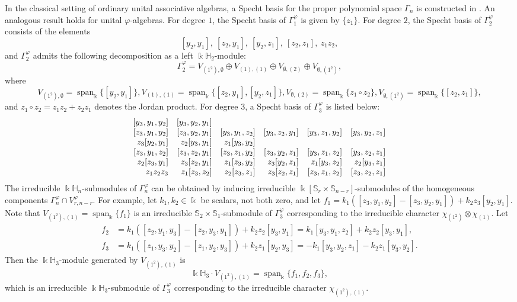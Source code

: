 \documentclass{amsart}
\theoremstyle{definition}
\theoremstyle{remark}
\numberwithin{equation}{section}
\def \Ga{\Gamma}
\def \vp{\varphi}
\def \k{\Bbbk}
\def \H{\mathbb{H}}
\def \S{\mathbb{S}}
\def \sp{\operatorname{span}}
\def \es{\emptyset}
\begin{document}
	In the classical setting of ordinary unital associative algebras, a Specht basis for the proper polynomial space $\Ga_n$ is constructed in \cite[Theorem 4.3.9]{Dr}. An analogous result holds for unital $\vp$-algebras. For degree $1$, the Specht basis of $\Ga_1^\vp$ is given by $\{z_1\}$. For degree $2$, the Specht basis of $\Ga_2^\vp$ consists of the elements
	\[
	[y_2,y_1],\ [z_2,y_1],\ [y_2,z_1],\ [z_2,z_1],\ z_1z_2,
	\]
	and $\Ga_2^\vp$ admits the following decomposition as a left $\k\H_2$-module:
	\[
	\Ga_2^\vp = V_{(1^2), \es} \oplus V_{(1), (1)} \oplus V_{\es, (2)} \oplus V_{\es, (1^2)},
	\]
	where
	\[
		V_{(1^2), \es} = \sp_\k \{ [y_2,y_1] \}, 
		V_{(1), (1)} = \sp_\k \{ [z_2,y_1], [y_2,z_1] \}, 
		V_{\es, (2)} = \sp_\k \{ z_1\circ z_2 \}, 
		V_{\es, (1^2)} = \sp_\k \{ [z_2,z_1] \},
	\]
	and $z_1 \circ z_2 = z_1 z_2 + z_2 z_1$ denotes the Jordan product. For degree $3$, a Specht basis of $\Ga_3^\vp$ is listed below:
	\[
	\begin{array}{rrrrrr}
		\relax [y_3,y_1,y_2] & [y_3,y_2,y_1] & & & & \\
		\relax [z_3,y_1,y_2] & [z_3,y_2,y_1] & [y_3,y_1,z_2] & [y_3,z_2,y_1]  & [y_3,z_1,y_2] & [y_3,y_2,z_1] \\
		z_3[y_2,y_1]         & z_2[y_3,y_1]  & z_1[y_3,y_2]  & & &\\
		\relax [z_3,y_1,z_2] & [z_3,z_2,y_1] & [z_3,z_1,y_2] & [z_3,y_2,z_1] & [y_3,z_1,z_2] & [y_3,z_2,z_1]\\ 
		z_2[z_3,y_1]         & z_3[z_2,y_1]  & z_1[z_3,y_2]  & z_3[y_2,z_1]  & z_1[y_3,z_2]  & z_2[y_3,z_1] \\
		z_1z_2z_3            & z_1[z_3,z_2]  & z_2[z_3,z_1]  & z_3[z_2,z_1]  & [z_3,z_1,z_2] & [z_3,z_2,z_1]
	\end{array}
	\]
	The irreducible $\k\H_n$-submodules of $\Ga_n^\vp$ can be obtained by inducing irreducible $\k[\S_r \times \S_{n-r}]$-submodules of the homogeneous components $\Ga_n^\vp \cap V_{r,n-r}^\vp$. For example, let $k_1,k_2 \in \k$ be scalars, not both zero, and let $f_1 = k_1([z_3,y_1,y_2] - [z_3,y_2,y_1]) + k_2 z_3[y_2,y_1]$. Note that $V_{(1^2),(1)} = \sp_\k\{ f_1 \}$ is an irreducible $\S_2 \times \S_1$-submodule of $\Ga_3^\vp$ corresponding to the irreducible character $\chi_{(1^2)} \otimes \chi_{(1)}$. Let
	\[
	\begin{aligned}
		f_2 &= k_1([z_2,y_1,y_3] - [z_2,y_3,y_1]) + k_2 z_2[y_3,y_1]= k_1[y_3,y_1,z_2]+k_2 z_2[y_3,y_1], \\
		f_3 &= k_1([z_1,y_3,y_2] - [z_1,y_2,y_3]) + k_2 z_1[y_2,y_3]= -k_1[y_3,y_2,z_1]-k_2 z_1[y_3,y_2].
	\end{aligned}
	\]
	Then the $\k\H_3$-module generated by $V_{(1^2),(1)}$ is
	\[
	\k\H_3 \cdot V_{(1^2),(1)} =\sp_\k \{ f_1, f_2, f_3 \},
	\]
	which is an irreducible $\k\H_3$-submodule of $\Ga_3^\vp$ corresponding to the irreducible character $\chi_{(1^2),(1)}$.	
\end{document}
